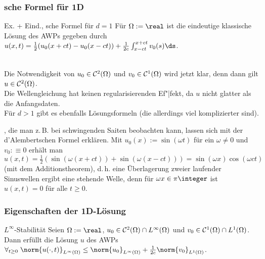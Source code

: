 \pagebreak

\subsubsection{%
    sche Formel für 1D%
}

\begin{Satz}{Ex. + Eind., sche Formel für $d = 1$}
    Für $\Omega := \real$ ist die eindeutige klassische Lösung des AWPs gegeben durch
    $u(x, t) = \frac{1}{2} (u_0(x+ct) - u_0(x-ct)) + \frac{1}{2c} \int_{x-ct}^{x+ct} v_0(s) \ds$.
\end{Satz}

\begin{Bem}\\
    Die Notwendigkeit von $u_0 \in \mathcal{C}^2(\Omega)$ und $v_0 \in \mathcal{C}^1(\Omega)$ wird jetzt klar,
    denn dann gilt $u \in \mathcal{C}^2(\Omega)$.\\
    Die Wellengleichung hat keinen regularisierenden Ef"|fekt, da $u$ nicht glatter
    als die Anfangsdaten.\\
    Für $d > 1$ gibt es ebenfalls Lösungsformeln (die allerdings viel komplizierter sind).
\end{Bem}

\begin{Bem}
    , die man z.\,B. bei schwingenden Saiten beobachten kann,
    lassen sich mit der d'Alembertschen Formel erklären.
    Mit $u_0(x) := \sin(\omega t)$ für ein $\omega \not= 0$ und $v_0 :\equiv 0$
    erhält man $u(x, t) = \frac{1}{2} (\sin(\omega(x+ct)) + \sin(\omega(x-ct)))
    = \sin(\omega x) \cos(\omega ct)$ (mit dem Additionstheorem),
    d.\,h. eine Überlagerung zweier laufender Sinuswellen ergibt eine stehende Welle,
    denn für $\omega x \in \pi\integer$ ist $u(x, t) = 0$ für alle $t \ge 0$.
\end{Bem}

\subsubsection{%
    Eigenschaften der 1D-Lösung%
}

\begin{Satz}{$L^\infty$-Stabilität}
    Seien $\Omega := \real$, $u_0 \in \mathcal{C}^2(\Omega) \cap L^\infty(\Omega)$ und
    $v_0 \in \mathcal{C}^1(\Omega) \cap L^1(\Omega)$.\\
    Dann erfüllt die Lösung $u$ des AWPs
    $\forall_{t \ge 0}\; \norm{u(\cdot, t)}_{L^\infty(\Omega)} \le \norm{u_0}_{L^\infty(\Omega)} +
    \frac{1}{2c} \norm{v_0}_{L^1(\Omega)}$.
\end{Satz}

